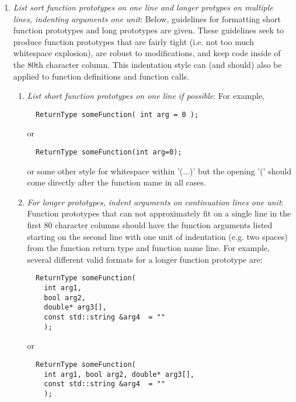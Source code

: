 \begin{enumerate}
{}\item\textit{List sort function prototypes on one line and longer protypes
on multiple lines, indenting arguments one unit}: Below, guidelines for
formatting short function prototypes and long prototypes are given.  These
guidelines seek to produce function prototypes that are fairly tight (i.e. not
too much whitespace explosion), are robust to modifications, and keep code
inside of the 80th character column.  This indentation style can (and should)
also be applied to function definitions and function calls.

  \begin{enumerate}

  {}\item\textit{List short function prototypes on one line if possible}: For
  example,

  {\small\begin{verbatim}
  ReturnType someFunction( int arg = 0 );
  \end{verbatim}}

  or 

  {\small\begin{verbatim}
  ReturnType someFunction(int arg=0);
  \end{verbatim}}

  or some other style for whitespace within '(...)' but the opening '(' should
  come directly after the function name in all cases.

  {}\item\textit{For longer prototypes, indent arguments on continuation lines
  one unit}: Function prototypes that can not approximately fit on a single
  line in the first 80 character columns should have the function arguments
  listed starting on the second line with one unit of indentation (e.g. two
  spaces) from the function return type and function name line.  For example,
  several different valid formats for a longer function prototype are:

  {\small\begin{verbatim}
  ReturnType someFunction(
    int arg1,
    bool arg2,
    double* arg3[],
    const std::string &arg4  = ""
    );
  \end{verbatim}}
  
  or
  
  {\small\begin{verbatim}
  ReturnType someFunction(
    int arg1, bool arg2, double* arg3[],
    const std::string &arg4  = ""
    );
  \end{verbatim}}
  

\end{enumerate}
\end{enumerate}

